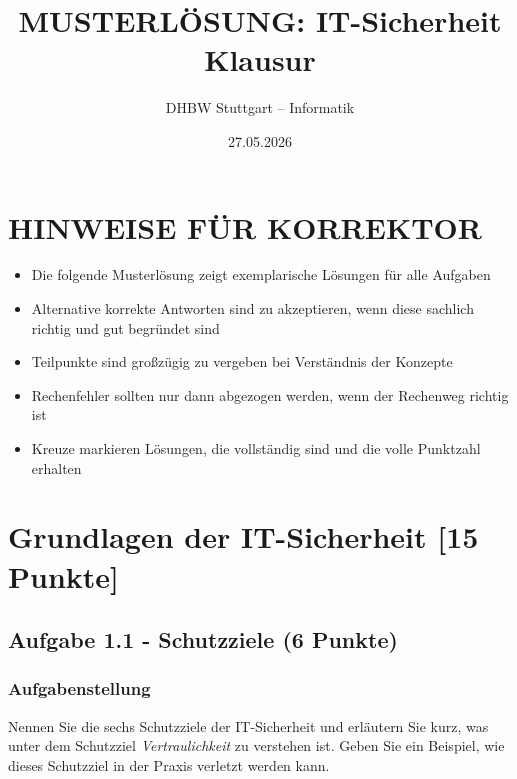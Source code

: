 \documentclass[12pt,a4paper]{article}
\title{\textbf{MUSTERLÖSUNG: IT-Sicherheit Klausur}}
\author{DHBW Stuttgart -- Informatik}
\date{27.05.2026}
\begin{document}
\maketitle


\section*{HINWEISE FÜR KORREKTOR}

\begin{tcolorbox}[colback=yellow!10, colframe=orange!50, title=Bewertungshinweise]
\begin{itemize}
    \item Die folgende Musterlösung zeigt exemplarische Lösungen für alle Aufgaben
    \item Alternative korrekte Antworten sind zu akzeptieren, wenn diese sachlich richtig und gut begründet sind
    \item Teilpunkte sind großzügig zu vergeben bei Verständnis der Konzepte
    \item Rechenfehler sollten nur dann abgezogen werden, wenn der Rechenweg richtig ist
    \item Kreuze \checkmark markieren Lösungen, die vollständig sind und die volle Punktzahl erhalten
\end{itemize}
\end{tcolorbox}

\newpage

\tableofcontents

\newpage


\section{Grundlagen der IT-Sicherheit [15 Punkte]}

\subsection{Aufgabe 1.1 - Schutzziele (6 Punkte)}

\subsubsection*{Aufgabenstellung}
Nennen Sie die sechs Schutzziele der IT-Sicherheit und erläutern Sie kurz, was unter dem Schutzziel \textit{Vertraulichkeit} zu verstehen ist. Geben Sie ein Beispiel, wie dieses Schutzziel in der Praxis verletzt werden kann.
\end{document}
